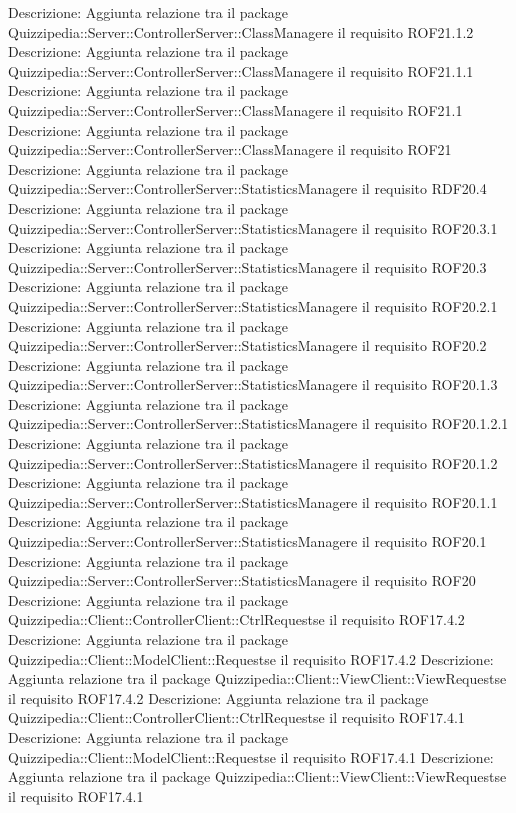 Descrizione: Aggiunta relazione tra il package Quizzipedia::Server::ControllerServer::ClassManagere il requisito ROF21.1.2 
Descrizione: Aggiunta relazione tra il package Quizzipedia::Server::ControllerServer::ClassManagere il requisito ROF21.1.1 
Descrizione: Aggiunta relazione tra il package Quizzipedia::Server::ControllerServer::ClassManagere il requisito ROF21.1 
Descrizione: Aggiunta relazione tra il package Quizzipedia::Server::ControllerServer::ClassManagere il requisito ROF21 
Descrizione: Aggiunta relazione tra il package Quizzipedia::Server::ControllerServer::StatisticsManagere il requisito RDF20.4 
Descrizione: Aggiunta relazione tra il package Quizzipedia::Server::ControllerServer::StatisticsManagere il requisito ROF20.3.1 
Descrizione: Aggiunta relazione tra il package Quizzipedia::Server::ControllerServer::StatisticsManagere il requisito ROF20.3 
Descrizione: Aggiunta relazione tra il package Quizzipedia::Server::ControllerServer::StatisticsManagere il requisito ROF20.2.1 
Descrizione: Aggiunta relazione tra il package Quizzipedia::Server::ControllerServer::StatisticsManagere il requisito ROF20.2 
Descrizione: Aggiunta relazione tra il package Quizzipedia::Server::ControllerServer::StatisticsManagere il requisito ROF20.1.3 
Descrizione: Aggiunta relazione tra il package Quizzipedia::Server::ControllerServer::StatisticsManagere il requisito ROF20.1.2.1 
Descrizione: Aggiunta relazione tra il package Quizzipedia::Server::ControllerServer::StatisticsManagere il requisito ROF20.1.2 
Descrizione: Aggiunta relazione tra il package Quizzipedia::Server::ControllerServer::StatisticsManagere il requisito ROF20.1.1 
Descrizione: Aggiunta relazione tra il package Quizzipedia::Server::ControllerServer::StatisticsManagere il requisito ROF20.1 
Descrizione: Aggiunta relazione tra il package Quizzipedia::Server::ControllerServer::StatisticsManagere il requisito ROF20 
Descrizione: Aggiunta relazione tra il package Quizzipedia::Client::ControllerClient::CtrlRequestse il requisito ROF17.4.2 
Descrizione: Aggiunta relazione tra il package Quizzipedia::Client::ModelClient::Requestse il requisito ROF17.4.2 
Descrizione: Aggiunta relazione tra il package Quizzipedia::Client::ViewClient::ViewRequestse il requisito ROF17.4.2 
Descrizione: Aggiunta relazione tra il package Quizzipedia::Client::ControllerClient::CtrlRequestse il requisito ROF17.4.1 
Descrizione: Aggiunta relazione tra il package Quizzipedia::Client::ModelClient::Requestse il requisito ROF17.4.1 
Descrizione: Aggiunta relazione tra il package Quizzipedia::Client::ViewClient::ViewRequestse il requisito ROF17.4.1 

